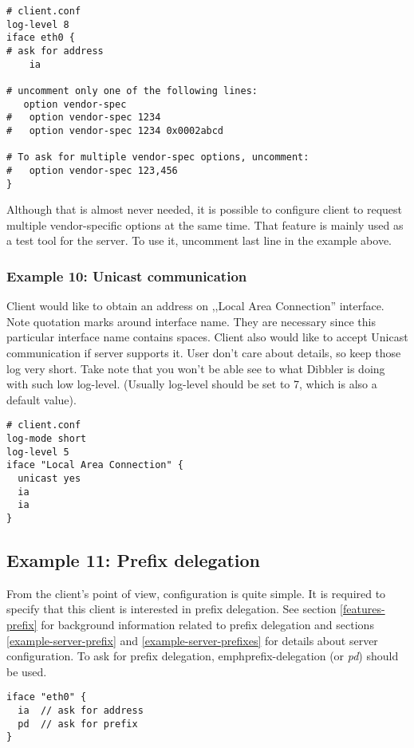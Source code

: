 \begin{lstlisting}
# client.conf
log-level 8
iface eth0 {
# ask for address
    ia

# uncomment only one of the following lines:
   option vendor-spec
#   option vendor-spec 1234
#   option vendor-spec 1234 0x0002abcd

# To ask for multiple vendor-spec options, uncomment:
#   option vendor-spec 123,456
}
\end{lstlisting}

Although that is almost never needed, it is possible to configure
client to request multiple vendor-specific options at the same
time. That feature is mainly used as a test tool for the server. To
use it, uncomment last line in the example above.

\subsubsection{Example 10: Unicast communication}

Client would like to obtain an address on ,,Local Area Connection''
interface. Note quotation marks around
interface name. They are necessary since this particular interface name
contains spaces. Client also would like to accept Unicast
communication if server supports it. User don't care about
details, so keep those log very short. Take note that you won't be
able see to what Dibbler is doing with such low log-level. (Usually
log-level should be set to 7, which is also a default value).

\begin{lstlisting}
# client.conf
log-mode short
log-level 5
iface "Local Area Connection" {
  unicast yes
  ia
  ia
}
\end{lstlisting}

\subsection{Example 11: Prefix delegation}
\label{example-client-prefix}
From the client's point of view, configuration is quite simple. It is
required to specify that this client is interested in prefix
delegation. See section \ref{features-prefix} for background
information related to prefix delegation and sections
\ref{example-server-prefix} and \ref{example-server-prefixes} for
details about server configuration. To ask for prefix delegation, 
emph{prefix-delegation} (or \emph{pd}) should be used.

\begin{lstlisting}
iface "eth0" {
  ia  // ask for address
  pd  // ask for prefix
}
\end{lstlisting}

